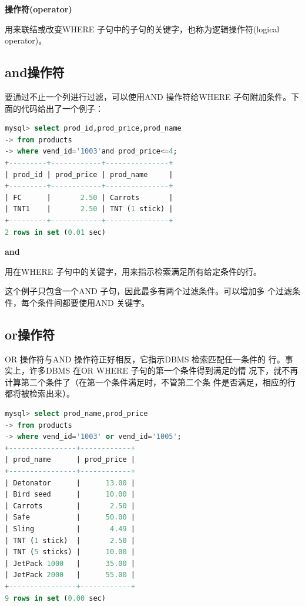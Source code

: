 \documentclass[11pt,a4paper,oneside]{book}
\begin{document}
\begin{tcolorbox}[colback=blue!7!white,colframe=blue!40]
\textbf{操作符(operator)}

用来联结或改变WHERE 子句中的子句的关键字，也称为逻辑操作符(logical operator)。
\end{tcolorbox}

\subsection{and操作符}
要通过不止一个列进行过滤，可以使用AND 操作符给WHERE 子句附加条件。下面的代码给出了一个例子：
\begin{lstlisting}[language=sql]
mysql> select prod_id,prod_price,prod_name
-> from products
-> where vend_id='1003'and prod_price<=4;
+---------+------------+---------------+
| prod_id | prod_price | prod_name     |
+---------+------------+---------------+
| FC      |       2.50 | Carrots       |
| TNT1    |       2.50 | TNT (1 stick) |
+---------+------------+---------------+
2 rows in set (0.01 sec)
\end{lstlisting}
\begin{tcolorbox}[colback=blue!7!white,colframe=blue!40]
	\textbf{and}
	
	用在WHERE 子句中的关键字，用来指示检索满足所有给定条件的行。
\end{tcolorbox}
这个例子只包含一个AND 子句，因此最多有两个过滤条件。可以增加多
个过滤条件，每个条件间都要使用AND 关键字。

\subsection{or操作符}
OR 操作符与AND 操作符正好相反，它指示DBMS 检索匹配任一条件的
行。事实上，许多DBMS 在OR WHERE 子句的第一个条件得到满足的情
况下，就不再计算第二个条件了（在第一个条件满足时，不管第二个条
件是否满足，相应的行都将被检索出来）。
\begin{lstlisting}[language=sql]
mysql> select prod_name,prod_price
-> from products
-> where vend_id='1003' or vend_id='1005';
+----------------+------------+
| prod_name      | prod_price |
+----------------+------------+
| Detonator      |      13.00 |
| Bird seed      |      10.00 |
| Carrots        |       2.50 |
| Safe           |      50.00 |
| Sling          |       4.49 |
| TNT (1 stick)  |       2.50 |
| TNT (5 sticks) |      10.00 |
| JetPack 1000   |      35.00 |
| JetPack 2000   |      55.00 |
+----------------+------------+
9 rows in set (0.00 sec)
\end{lstlisting}
\end{document}
